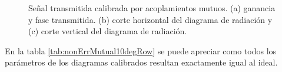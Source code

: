 \begin{figure}[H]
	\centering

	\caption{Señal transmitida calibrada por acoplamientos mutuos. (a) ganancia y fase transmitida. (b) corte horizontal del 
	diagrama de radiación y (c) corte vertical del diagrama de radiación.}
	\label{fig:nonErrMutual10degRow}
\end{figure}

En la tabla \ref{tab:nonErrMutual10degRow} se puede apreciar como todos los parámetros de los diagramas calibrados resultan 
exactamente igual al ideal.

